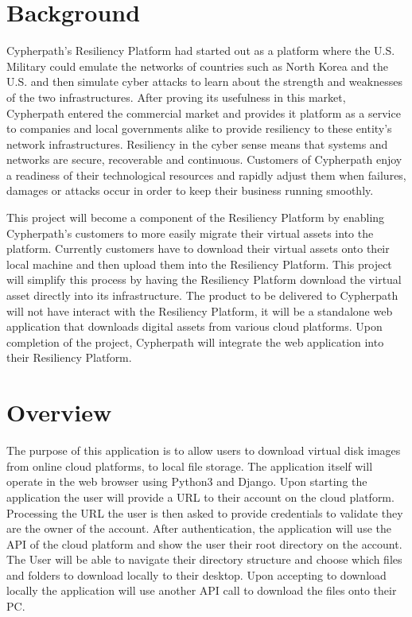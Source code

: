 \documentclass{article}
\begin{document}
    \section{Background}
    Cypherpath's Resiliency Platform had started out as a platform where the U.S. Military could emulate the networks of countries such as North Korea and the U.S. and then simulate cyber attacks to
    learn about the strength and weaknesses of the two infrastructures. After proving its usefulness in this market, Cypherpath entered the commercial market and provides it platform as a service to
    companies and local governments alike to provide resiliency to these entity's network infrastructures. Resiliency in the cyber sense means that systems and networks are secure, recoverable and
    continuous. Customers of Cypherpath enjoy a readiness of their technological resources and rapidly adjust them when failures, damages or attacks occur in order to keep their business running smoothly.

    This project will become a component of the Resiliency Platform by enabling Cypherpath's customers to more easily migrate their virtual assets into the platform. Currently customers have to download
    their virtual assets onto their local machine and then upload them into the Resiliency Platform. This project will simplify this process by having the Resiliency Platform download the virtual asset directly
    into its infrastructure. The product to be delivered to Cypherpath will not have interact with the Resiliency Platform, it will be a standalone web application that downloads digital assets from various cloud
    platforms. Upon completion of the project, Cypherpath will integrate the web application into their Resiliency Platform.


	
    \section{Overview}
    The purpose of this application is to allow users to download virtual disk images from online cloud platforms, to local file storage.
    The application itself will operate in the web browser using Python3 and Django. Upon starting the application the user will
    provide a URL to their account on the cloud platform. Processing the URL the user is then asked to provide credentials to validate they are the owner of
    the account. After authentication, the application will use the API of the cloud platform and show the user their root directory on the account.
    The User will be able to navigate their directory structure and choose which files and folders to download locally to their desktop.
    Upon accepting to download locally the application will use another API call to download the files onto their PC.
\end{document}
